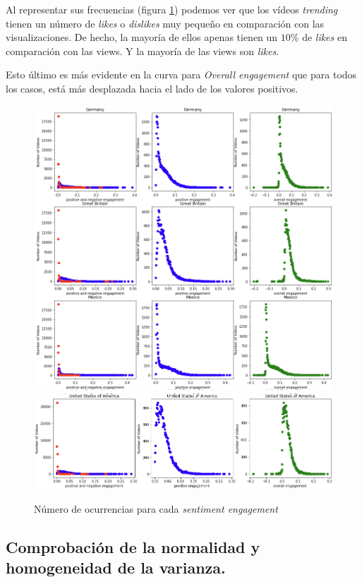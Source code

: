 \documentclass[a4paper,12pt]{article}
\begin{document}
Al representar sus frecuencias (figura \ref{fig:rengan}) podemos ver que los v\'ideos {\itshape trending} tienen un n\'umero de {\itshape likes} o {\itshape dislikes} muy peque\~no en comparaci\'on con las visualizaciones. De hecho, la mayor\'ia  de ellos apenas tienen un $10\%$ de {\itshape likes} en comparaci\'on con las views. Y la mayor\'ia de las views son {\itshape likes}. 

Esto \'ultimo es m\'as evidente en la curva  para {\itshape Overall engagement} que para todos los casos, est\'a m\'as desplazada hacia el lado de los valores positivos.


\begin{figure}[h!]
\centering
\includegraphics[width=13cm]{engagement_1.png}
\includegraphics[width=13cm]{engagement_2.png}
\caption{N\'umero de ocurrencias para cada {\itshape sentiment engagement}}
\label{fig:rengan}
\end{figure}

\subsection{Comprobaci\'on de la normalidad y homogeneidad de la varianza.}
\end{document}
